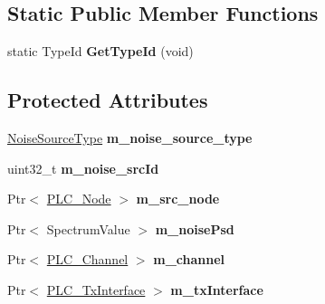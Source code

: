 \subsection*{\-Static \-Public \-Member \-Functions}
\begin{DoxyCompactItemize}
\item 
\hypertarget{classns3_1_1PLC__NoiseSource_a56ebebf6999795b86666c5cd81ddbb7a}{static \-Type\-Id {\bfseries \-Get\-Type\-Id} (void)}\label{classns3_1_1PLC__NoiseSource_a56ebebf6999795b86666c5cd81ddbb7a}

\end{DoxyCompactItemize}
\subsection*{\-Protected \-Attributes}
\begin{DoxyCompactItemize}
\item 
\hypertarget{classns3_1_1PLC__NoiseSource_ab3322f38aab36c853b510005586c6f1f}{\hyperlink{classns3_1_1PLC__NoiseSource_a3f5751ed7e0ffe2f0c9ad37d2c75ff2b}{\-Noise\-Source\-Type} {\bfseries m\-\_\-noise\-\_\-source\-\_\-type}}\label{classns3_1_1PLC__NoiseSource_ab3322f38aab36c853b510005586c6f1f}

\item 
\hypertarget{classns3_1_1PLC__NoiseSource_a188ca4a4774d742fec3f47786c058dea}{uint32\-\_\-t {\bfseries m\-\_\-noise\-\_\-src\-Id}}\label{classns3_1_1PLC__NoiseSource_a188ca4a4774d742fec3f47786c058dea}

\item 
\hypertarget{classns3_1_1PLC__NoiseSource_ad662fa5660b51b3def6d1de3e7cec431}{\-Ptr$<$ \hyperlink{classns3_1_1PLC__Node}{\-P\-L\-C\-\_\-\-Node} $>$ {\bfseries m\-\_\-src\-\_\-node}}\label{classns3_1_1PLC__NoiseSource_ad662fa5660b51b3def6d1de3e7cec431}

\item 
\hypertarget{classns3_1_1PLC__NoiseSource_a518e97ac1af538cc5b0882e9377f8d5e}{\-Ptr$<$ \-Spectrum\-Value $>$ {\bfseries m\-\_\-noise\-Psd}}\label{classns3_1_1PLC__NoiseSource_a518e97ac1af538cc5b0882e9377f8d5e}

\item 
\hypertarget{classns3_1_1PLC__NoiseSource_a45823912e0c463830a12bf19b48c33eb}{\-Ptr$<$ \hyperlink{classns3_1_1PLC__Channel}{\-P\-L\-C\-\_\-\-Channel} $>$ {\bfseries m\-\_\-channel}}\label{classns3_1_1PLC__NoiseSource_a45823912e0c463830a12bf19b48c33eb}

\item 
\hypertarget{classns3_1_1PLC__NoiseSource_a81eefe10f70528eb58bc84ed66c76ba5}{\-Ptr$<$ \hyperlink{classns3_1_1PLC__TxInterface}{\-P\-L\-C\-\_\-\-Tx\-Interface} $>$ {\bfseries m\-\_\-tx\-Interface}}\label{classns3_1_1PLC__NoiseSource_a81eefe10f70528eb58bc84ed66c76ba5}


\end{DoxyCompactItemize}
